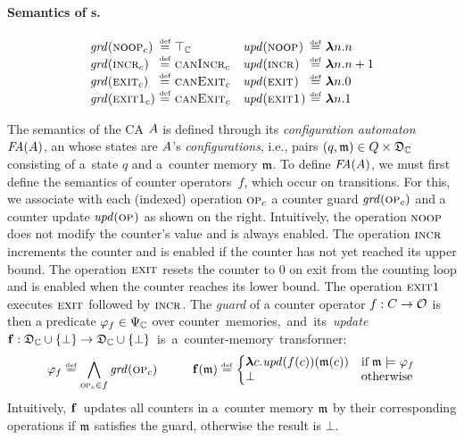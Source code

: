 \documentclass[acmsmall,screen]{acmart}
\begin{document}
\paragraph{Semantics of {\CA}s.}


\begin{figure}
\vspace*{-7mm}
\hspace*{-2mm}\begin{minipage}{72mm}
\[
\begin{array}{l@{\ \defeq\ }l@{\quad}l@{\ \eqdef\ }l}
\guard{\NoOp[c]}		&\top_{\CC}	& \update{\NoOp}	&  \blambda n.n \\
\guard{\IncrOp[c]}	&\CanIncr{c} 	& \update{\IncrOp}	&  \blambda n.n+1  \\
\guard{\ExitOp[c]}	&\CanExit{c} 	& \update{\ExitOp}	&  \blambda n.0    \\
\guard{\ExitIncrOp[c]}	&\CanExit{c} 	& \update{\ExitIncrOp}&  \blambda n.1    
\end{array}
\]
\end{minipage}
\end{figure}
%
The semantics of the CA $\aut$ is defined through its \emph{configuration
  automaton}~$\NFAof{\aut}$, an \FA whose states are $\aut$'s
\emph{configurations}, i.e., pairs $(q,\mem)\in Q\times\DOM_{\CC}$
consisting of a~state $q$ and a~counter memory $\mem$.
To define
$\NFAof{A}$, we must first define the semantics of counter
operators~$f$, which occur on transitions.  For this, we associate with each
(indexed) operation $\Op[c]$ a 
counter 
guard $\guard{\Op[c]}$ and a
counter update $\update{\Op}$ as shown on the right.
%
Intuitively, the operation $\NoOp$ does not modify the counter's value
and is always enabled.  The operation $\IncrOp$ 
increments the counter and 
is enabled if the counter has not yet reached its upper bound.
The operation $\ExitOp$ resets the counter to 0 on exit
from the counting loop and is enabled when the counter reaches its
lower bound.  The operation $\ExitIncrOp$ executes $\ExitOp$
followed by $\IncrOp$.
%
The \emph{guard} of a counter operator $f:C\rightarrow \OPS$ is then a
predicate $\Guard{f}\in\PRED_\CC$ over \mbox{counter memories, and its
\emph{update} $\Update{f}:\DOM_\CC\cup\{\bot\}
\rightarrow \DOM_\CC\cup\{\bot\}$ is a counter-memory transformer:}
%
$$
    \Guard{f} \eqdef  \bigwedge_{\Op[c]\in f}\guard{\Op[c]} \hspace{10mm}
    \Update{f}(\mem) \eqdef  
      \BraceIfThenElse{\mem\models\Guard{f}}{\boldsymbol{\lambda} c. 
      \update{f(c)}(\mem(c))}{\bot}
$$
%
Intuitively, $\Update{f}$~updates all counters in a~counter memory $\mem$ by
their corresponding operations if $\mem$ satisfies the guard, otherwise the
result is $\bot$.
\end{document}
